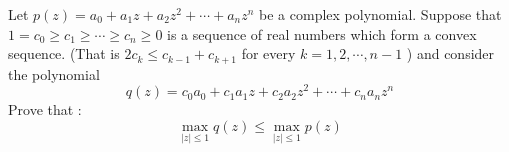 Let $p(z)=a_0+a_1z+a_2z^2+\cdots+a_nz^n$ be a complex polynomial. Suppose that $1=c_0\ge c_1\ge \cdots \ge c_n\ge 0$ is a sequence of real numbers which form a convex sequence. (That is $2c_k\le c_{k-1}+c_{k+1}$ for every $k=1,2,\cdots ,n-1$ ) and consider the polynomial
\[ q(z)=c_0a_0+c_1a_1z+c_2a_2z^2+\cdots +c_na_nz^n \]
Prove that :
\[ \max_{|z|\le 1}q(z)\le \max_{|z|\le 1}p(z) \]